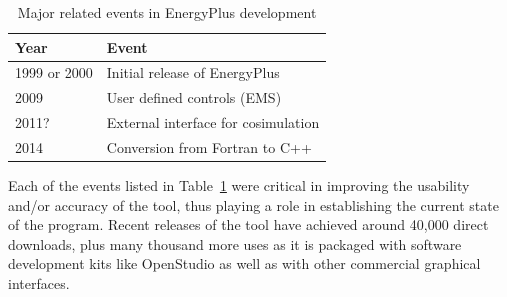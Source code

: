 \documentclass[5p]{elsarticle}
\begin{document}
\begin{table}[h!]
\begin{center}
\caption{Major related events in EnergyPlus development}
\begin{tabular}{@{}ll@{}}
\toprule
Year         & Event                               \\ 
\midrule
1999 or 2000 & Initial release of EnergyPlus       \\
2009         & User defined controls (EMS)         \\
2011?        & External interface for cosimulation \\
2014         & Conversion from Fortran to C++      \\ 
\bottomrule
\end{tabular}
\label{table:background:events}
\end{center}
\end{table}

Each of the events listed in Table~\ref{table:background:events} were critical in improving the usability and/or accuracy of the tool, thus playing a role in establishing the current state of the program.  Recent releases of the tool have achieved around 40,000 direct downloads, plus many thousand more uses as it is packaged with software development kits like OpenStudio as well as with other commercial graphical interfaces. 
\end{document}
